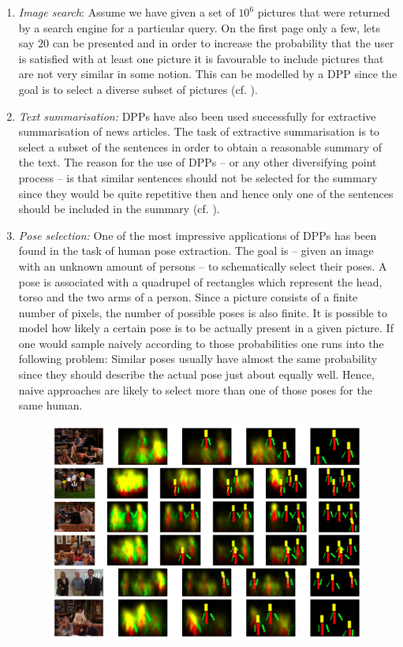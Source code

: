 \begin{enumerate}
\item \emph{Image search}: Assume we have given a set of \(10^6\) pictures that were returned by a search engine for a particular query. On the first page only a few, lets say \(20\) can be presented and in order to increase the probability that the user is satisfied with at least one picture it is favourable to include pictures that are not very similar in some notion. This can be modelled by a DPP since the goal is to select a diverse subset of pictures (cf. \cite{kulesza2011k}). \item \emph{Text summarisation:} DPPs have also been used successfully for extractive summarisation of news articles. The task of extractive summarisation is to select a subset of the sentences in order to obtain a reasonable summary of the text. The reason for the use of DPPs -- or any other diversifying point process -- is that similar sentences should not be selected for the summary since they would be quite repetitive then and hence only one of the sentences should be included in the summary (cf. \cite{kulesza2012learning1}). 
\item \emph{Pose selection:} One of the most impressive applications of DPPs has been found in the task of human pose extraction. The goal is -- given an image with an unknown amount of persons -- to schematically select their poses. A pose is associated with a quadrupel of rectangles which represent the head, torso and the two arms of a person. Since a picture consists of a finite number of pixels, the number of possible poses is also finite. It is possible to model how likely a certain pose is to be actually present in a given picture. If one would sample naively according to those probabilities one runs into the following problem: Similar poses usually have almost the same probability since they should describe the actual pose just about equally well. Hence, naive approaches are likely to select more than one of those poses for the same human.
\begin{figure}[h!]
	\centering
	\includegraphics[width=0.99\textwidth]{figures/pose-estimation}

\end{figure}
\end{enumerate}
